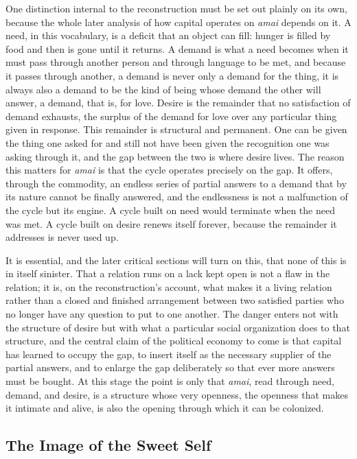 One distinction internal to the reconstruction must be set out plainly on its own, because the whole later analysis of how capital operates on \textit{amai} depends on it. A need, in this vocabulary, is a deficit that an object can fill: hunger is filled by food and then is gone until it returns. A demand is what a need becomes when it must pass through another person and through language to be met, and because it passes through another, a demand is never only a demand for the thing, it is always also a demand to be the kind of being whose demand the other will answer, a demand, that is, for love. Desire is the remainder that no satisfaction of demand exhausts, the surplus of the demand for love over any particular thing given in response. This remainder is structural and permanent. One can be given the thing one asked for and still not have been given the recognition one was asking through it, and the gap between the two is where desire lives. The reason this matters for \textit{amai} is that the cycle operates precisely on the gap. It offers, through the commodity, an endless series of partial answers to a demand that by its nature cannot be finally answered, and the endlessness is not a malfunction of the cycle but its engine. A cycle built on need would terminate when the need was met. A cycle built on desire renews itself forever, because the remainder it addresses is never used up.

It is essential, and the later critical sections will turn on this, that none of this is in itself sinister. That a relation runs on a lack kept open is not a flaw in the relation; it is, on the reconstruction's account, what makes it a living relation rather than a closed and finished arrangement between two satisfied parties who no longer have any question to put to one another. The danger enters not with the structure of desire but with what a particular social organization does to that structure, and the central claim of the political economy to come is that capital has learned to occupy the gap, to insert itself as the necessary supplier of the partial answers, and to enlarge the gap deliberately so that ever more answers must be bought. At this stage the point is only that \textit{amai}, read through need, demand, and desire, is a structure whose very openness, the openness that makes it intimate and alive, is also the opening through which it can be colonized.

\subsection{The Image of the Sweet Self}

